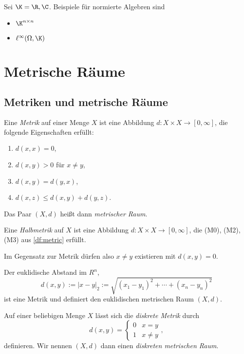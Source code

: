 \begin{ex}
	Sei $\K = \R, \C$.
	Beispiele für normierte Algebren sind
	\begin{itemize}
		\item
			$\K^{n\times n}$
		\item
			$\ell^\infty(\Omega, \K)$
	\end{itemize}
\end{ex}


\section{Metrische Räume}


\subsection{Metriken und metrische Räume}

\begin{df}[Metrik] \label{df:metric}
	Eine \emph{Metrik} auf einer Menge $X$ ist eine Abbildung $d : X \times X \to [0, \infty]$, die folgende Eigenschaften erfüllt:
	\begin{enumerate}[(M1),leftmargin=*,start=0]
		\item
			$d(x,x) = 0$,
		\item
			$d(x,y) > 0$ für $x\neq y$,
		\item
			$d(x,y) = d(y,x)$,
		\item
			$d(x,z) \le d(x,y) + d(y,z)$.
	\end{enumerate}

	Das Paar $(X,d)$ heißt dann \emph{metrischer Raum}.
\end{df}

\begin{df}[Halbmetrik] \label{df:pseudometric}
	Eine \emph{Halbmetrik} auf $X$ ist eine Abbildung $d: X \times X \to [0, \infty]$, die (M0), (M2), (M3) aus \ref{df:metric} erfüllt.
	\begin{note}
		Im Gegensatz zur Metrik dürfen also $x \neq y$ existieren mit $d(x,y) = 0$.
	\end{note}
\end{df}

\begin{ex}
	Der euklidische Abstand  im $R^n$,
	\[
		d(x,y) := |x-y|_2 := \sqrt{ (x_1 - y_1)^2  + \dotsb + (x_n - y_n)^2 }
	\]
	ist eine Metrik und definiert den euklidischen metrischen Raum $(X,d)$.
\end{ex}

\begin{ex} \label{ex:discrete_metric}
	Auf einer beliebigen Menge $X$ lässt sich die \emph{diskrete Metrik} durch
	\[
		d(x,y) = \begin{cases}
			0 & x=y \\
			1 & x\neq y
		\end{cases},
	\]
	definieren.
	Wir nennen $(X, d)$ dann einen \emph{diskreten metrischen Raum}.
\end{ex}

